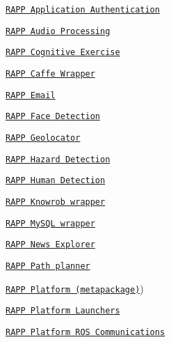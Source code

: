 \begin{DoxyItemize}
\item \href{https://github.com/rapp-project/rapp-platform/wiki/RAPP-Application-Authentication}{\tt R\-A\-P\-P Application Authentication}
\item \href{https://github.com/rapp-project/rapp-platform/wiki/RAPP-Audio-Processing}{\tt R\-A\-P\-P Audio Processing}
\item \href{https://github.com/rapp-project/rapp-platform/wiki/RAPP-Cognitive-Exercise}{\tt R\-A\-P\-P Cognitive Exercise}
\item \href{https://github.com/rapp-project/rapp-platform/wiki/RAPP-Caffe-Wrapper}{\tt R\-A\-P\-P Caffe Wrapper}
\item \href{https://github.com/rapp-project/rapp-platform/wiki/RAPP-Email}{\tt R\-A\-P\-P Email}
\item \href{https://github.com/rapp-project/rapp-platform/wiki/RAPP-Face-Detection}{\tt R\-A\-P\-P Face Detection}
\item \href{https://github.com/rapp-project/rapp-platform/wiki/RAPP-Geolocator}{\tt R\-A\-P\-P Geolocator}
\item \href{https://github.com/rapp-project/rapp-platform/wiki/RAPP-Hazard-Detection}{\tt R\-A\-P\-P Hazard Detection}
\item \href{https://github.com/rapp-project/rapp-platform/wiki/RAPP-Human-Detection}{\tt R\-A\-P\-P Human Detection}
\item \href{https://github.com/rapp-project/rapp-platform/wiki/RAPP-Knowrob-wrapper}{\tt R\-A\-P\-P Knowrob wrapper}
\item \href{https://github.com/rapp-project/rapp-platform/wiki/RAPP-MySQL-wrapper}{\tt R\-A\-P\-P My\-S\-Q\-L wrapper}
\item \href{https://github.com/rapp-project/rapp-platform/wiki/RAPP-News-Explorer}{\tt R\-A\-P\-P News Explorer}
\item \href{https://github.com/rapp-project/rapp-platform/wiki/RAPP-Path-planner}{\tt R\-A\-P\-P Path planner}
\item \href{https://github.com/rapp-project/rapp-platform/wiki/RAPP-Platform-(metapackage}{\tt R\-A\-P\-P Platform (metapackage)})
\item \href{https://github.com/rapp-project/rapp-platform/wiki/RAPP-Platform-Launchers}{\tt R\-A\-P\-P Platform Launchers}
\item \href{https://github.com/rapp-project/rapp-platform/wiki/RAPP-Platform-ROS-Communications}{\tt R\-A\-P\-P Platform R\-O\-S Communications}

\end{DoxyItemize}

